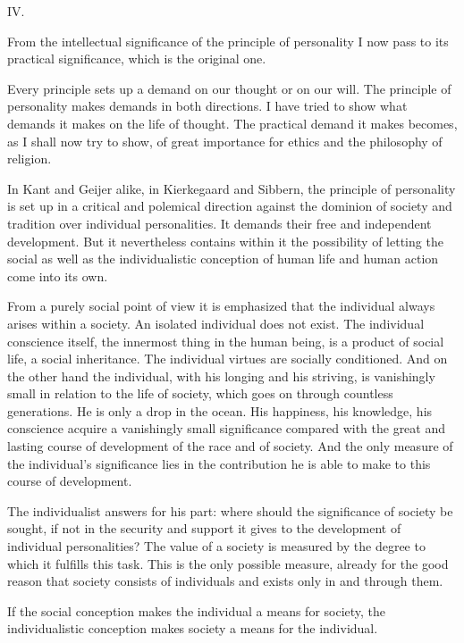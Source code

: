 \documentclass[12pt]{article}
\newcommand{\opage}[1]{\marginnote{\footnotesize\textit{[#1]}}}
\begin{document}
\opage{39}
\begin{center}\large IV.\end{center}

From the intellectual significance of the principle of personality I now pass
to its practical significance, which is the original one.

Every principle sets up a demand on our thought or on our will. The principle of
personality makes demands in both directions. I have tried to show what demands
it makes on the life of thought. The practical demand it makes becomes, as I
shall now try to show, of great importance for ethics and the philosophy of
religion.

In Kant and Geijer alike, in Kierkegaard and Sibbern, the principle of
personality is set up in a critical and polemical direction against the
dominion of society and tradition over individual personalities. It demands
their free and independent development. But it nevertheless contains within it
the possibility of letting the
\opage{40}%
social as well as the individualistic conception of human life and human action
come into its own.

From a purely social point of view it is emphasized that the individual always
arises within a society. An isolated individual does not exist. The individual
conscience itself, the innermost thing in the human being, is a product of
social life, a social inheritance. The individual virtues are socially
conditioned. And on the other hand the individual, with his longing and his
striving, is vanishingly small in relation to the life of society, which goes
on through countless generations. He is only a drop in the ocean. His happiness,
his knowledge, his conscience acquire a vanishingly small significance compared
with the great and lasting course of development of the race and of society.
And the only measure of the individual's significance lies in the contribution
he is able to make to this course of development.

The individualist answers for his part: where should the significance of society
be sought, if not in the security and support it gives to the development of
individual personalities? The value of a society is measured by the degree to
which it fulfills this task. This
\opage{41}%
is the only possible measure, already for the good reason that society consists
of individuals and exists only in and through them.

If the social conception makes the individual a means for society, the
individualistic conception makes society a means for the individual.
\end{document}
